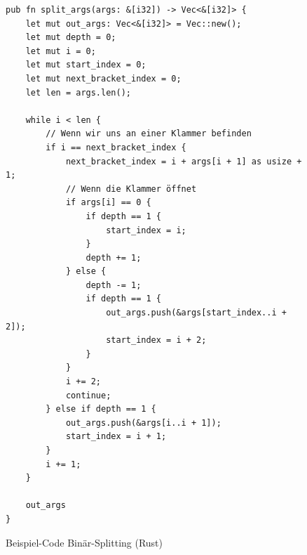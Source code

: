 \documentclass[ngerman]{article}
\begin{document}
\begin{figure}[htbp]
  \begin{code}
    \begin{verbatim}
pub fn split_args(args: &[i32]) -> Vec<&[i32]> {
    let mut out_args: Vec<&[i32]> = Vec::new();
    let mut depth = 0;
    let mut i = 0;
    let mut start_index = 0;
    let mut next_bracket_index = 0;
    let len = args.len();

    while i < len {
        // Wenn wir uns an einer Klammer befinden
        if i == next_bracket_index {
            next_bracket_index = i + args[i + 1] as usize + 1;
            // Wenn die Klammer öffnet
            if args[i] == 0 {
                if depth == 1 {
                    start_index = i;
                }
                depth += 1;
            } else {
                depth -= 1;
                if depth == 1 {
                    out_args.push(&args[start_index..i + 2]);
                    start_index = i + 2;
                }
            }
            i += 2;
            continue;
        } else if depth == 1 {
            out_args.push(&args[i..i + 1]);
            start_index = i + 1;
        }
        i += 1;
    }

    out_args
}
    \end{verbatim}
  \end{code}

  \caption{Beispiel-Code Binär-Splitting (Rust)}

\end{figure}

\pagebreak
\end{document}
